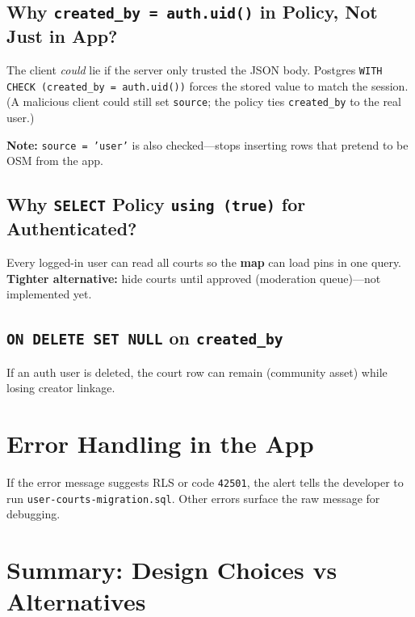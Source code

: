 \documentclass[11pt,a4paper]{article}
\begin{document}
\subsection{Why \texttt{created\_by = auth.uid()} in Policy, Not Just in App?}

The client \emph{could} lie if the server only trusted the JSON body. Postgres \texttt{WITH CHECK (created\_by = auth.uid())} forces the stored value to match the session. (A malicious client could still set \texttt{source}; the policy ties \texttt{created\_by} to the real user.)

\textbf{Note:} \texttt{source = 'user'} is also checked---stops inserting rows that pretend to be OSM from the app.

\subsection{Why \texttt{SELECT} Policy \texttt{using (true)} for Authenticated?}

Every logged-in user can read all courts so the \textbf{map} can load pins in one query. \textbf{Tighter alternative:} hide courts until approved (moderation queue)---not implemented yet.

\subsection{\texttt{ON DELETE SET NULL} on \texttt{created\_by}}

If an auth user is deleted, the court row can remain (community asset) while losing creator linkage.

\section{Error Handling in the App}

If the error message suggests RLS or code \texttt{42501}, the alert tells the developer to run \texttt{user-courts-migration.sql}. Other errors surface the raw message for debugging.

\section{Summary: Design Choices vs Alternatives}
\end{document}
